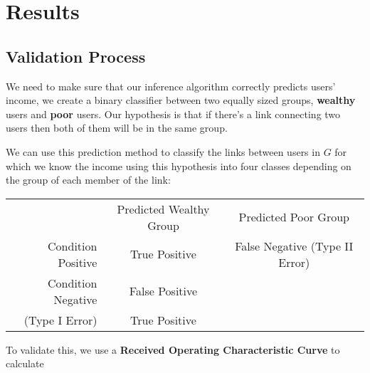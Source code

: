\section{Results}

\subsection{Validation Process}

We need to make sure that our inference algorithm correctly predicts users' income, we create a binary classifier between two equally sized groups, \textbf{wealthy} users and \textbf{poor} users. Our hypothesis is that if there's a link connecting two users then both of them will be in the same group.

We can use this prediction method to classify the links between users in $ G $ for which we know the income using this hypothesis into four classes depending on the group of each member of the link:

\begin{tabularx}{\textwidth}{r|c|c}
& Predicted Wealthy Group & Predicted Poor Group \\
Condition Positive & True Positive & False Negative \newline (Type II Error) \\
Condition Negative & False Positive \tabularnewline (Type I Error) & True Positive
\end{tabularx}

To validate this, we use a \textbf{Received Operating Characteristic Curve} to calculate 
